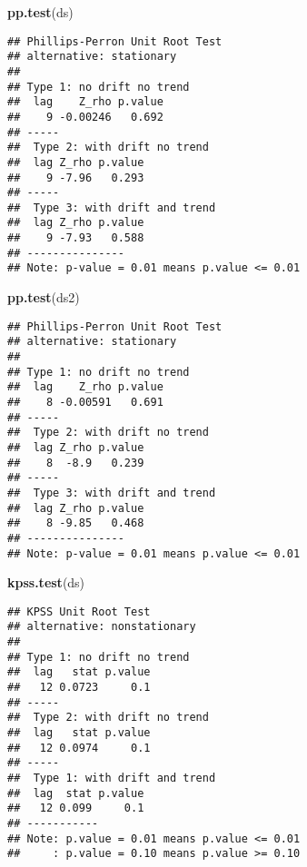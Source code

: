 \documentclass[]{article}
\newenvironment{Shaded}{\begin{snugshade}}{\end{snugshade}}
\newcommand{\KeywordTok}[1]{\textcolor[rgb]{0.13,0.29,0.53}{\textbf{#1}}}
\newcommand{\NormalTok}[1]{#1}
\begin{document}
\begin{Shaded}
\begin{Highlighting}[]
\KeywordTok{pp.test}\NormalTok{(ds)}
\end{Highlighting}
\end{Shaded}

\begin{multicols}{2}\begin{Verbatim}[fontsize=\small]
## Phillips-Perron Unit Root Test
## alternative: stationary
##
## Type 1: no drift no trend
##  lag    Z_rho p.value
##    9 -0.00246   0.692
## -----
##  Type 2: with drift no trend
##  lag Z_rho p.value
##    9 -7.96   0.293
## -----
##  Type 3: with drift and trend
##  lag Z_rho p.value
##    9 -7.93   0.588
## ---------------
## Note: p-value = 0.01 means p.value <= 0.01
\end{Verbatim}\end{multicols}

\begin{Shaded}
\begin{Highlighting}[]
\KeywordTok{pp.test}\NormalTok{(ds2)}
\end{Highlighting}
\end{Shaded}

\begin{multicols}{2}\begin{Verbatim}[fontsize=\small]
## Phillips-Perron Unit Root Test
## alternative: stationary
##
## Type 1: no drift no trend
##  lag    Z_rho p.value
##    8 -0.00591   0.691
## -----
##  Type 2: with drift no trend
##  lag Z_rho p.value
##    8  -8.9   0.239
## -----
##  Type 3: with drift and trend
##  lag Z_rho p.value
##    8 -9.85   0.468
## ---------------
## Note: p-value = 0.01 means p.value <= 0.01
\end{Verbatim}\end{multicols}

\begin{Shaded}
\begin{Highlighting}[]
\KeywordTok{kpss.test}\NormalTok{(ds)}
\end{Highlighting}
\end{Shaded}

\begin{multicols}{2}\begin{Verbatim}[fontsize=\small]
## KPSS Unit Root Test
## alternative: nonstationary
##
## Type 1: no drift no trend
##  lag   stat p.value
##   12 0.0723     0.1
## -----
##  Type 2: with drift no trend
##  lag   stat p.value
##   12 0.0974     0.1
## -----
##  Type 1: with drift and trend
##  lag  stat p.value
##   12 0.099     0.1
## -----------
## Note: p.value = 0.01 means p.value <= 0.01
##     : p.value = 0.10 means p.value >= 0.10
\end{Verbatim}
\end{multicols}
\end{document}

